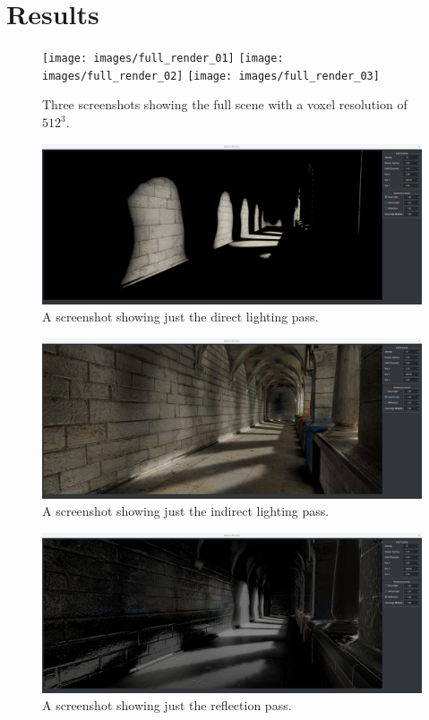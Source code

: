 \documentclass[]{acmsiggraph}
\begin{document}
\section{Results}

\begin{figure}[htbp]\centering
 \texttt{[image: images/full\_render\_01]}
 \texttt{[image: images/full\_render\_02]}
 \texttt{[image: images/full\_render\_03]}
 \caption{\label{fig:reference}Three screenshots showing the full scene with a voxel resolution of $512^3$.}
\end{figure}

\begin{figure}[htbp]\centering
 \includegraphics[width=1.0\linewidth]{images/direct_only}
 \caption{A screenshot showing just the direct lighting pass.}
\end{figure}

\begin{figure}[htbp]\centering
 \includegraphics[width=1.0\linewidth]{images/indirect_only}
 \caption{A screenshot showing just the indirect lighting pass.}
\end{figure}

\begin{figure}[htbp]\centering
 \includegraphics[width=1.0\linewidth]{images/reflection_only}
 \caption{A screenshot showing just the reflection pass.}
\end{figure}
\end{document}
